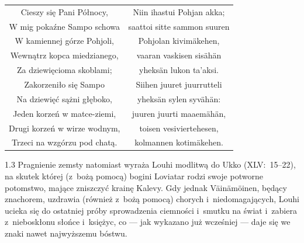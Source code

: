 \documentclass[11pt,a4paper,twoside]{report}
\begin{document}
{\centering
\small
\begin{longtable}{c c}
Cieszy się Pani Północy, & Niin ihastui Pohjan akka;\\
W mig pokaźne Sampo schowa & saattoi sitte sammon suuren\\
W kamiennej górze Pohjoli, & Pohjolan kivimäkehen,\\
Wewnątrz kopca miedzianego, & vaaran vaskisen sisähän\\
Za dziewięcioma skoblami; & yheksän lukon ta'aksi.\\
Zakorzeniło się Sampo & Siihen juuret juurrutteli\\
Na dziewięć sążni głęboko, & yheksän sylen syvähän:\\
Jeden korzeń w matce-ziemi, & juuren juurti maaemähän,\\
Drugi korzeń w wirze wodnym, & toisen vesiviertehesen,\\
Trzeci na wzgórzu pod chatą. & kolmannen kotimäkehen.\\
\end{longtable}
}
\begin{spacing}{1.3}
Pragnienie zemsty natomiast wyraża Louhi modlitwą do Ukko (XLV:~15--22), na skutek której (z~bożą pomocą) bogini Loviatar rodzi swoje potworne potomstwo, mające zniszczyć krainę Kalevy. Gdy jednak Väinämöinen, będący znachorem, uzdrawia (również z~bożą pomocą) chorych i~niedomagających, Louhi ucieka się do ostatniej próby sprowadzenia ciemności i~smutku na świat i~zabiera z~nieboskłonu słońce i~księżyc, co --- jak wykazano już wcześniej --- daje się we znaki nawet najwyższemu bóstwu.
\end{spacing}
\end{document}
